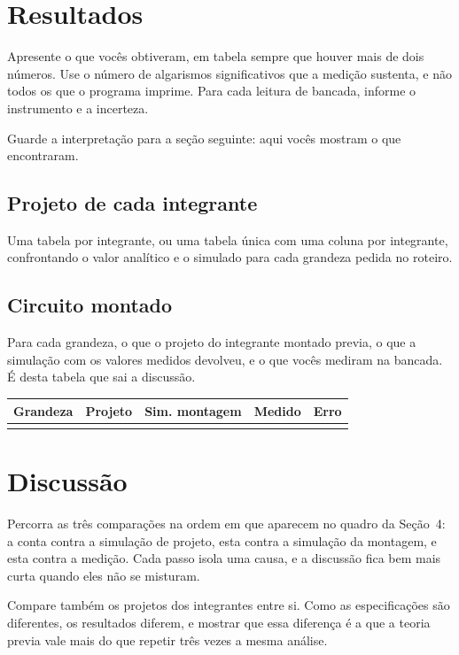 \documentclass[11pt,a4paper]{article}
\begin{document}
\section{Resultados}

Apresente o que vocês obtiveram, em tabela sempre que houver mais de dois números. Use o
número de algarismos significativos que a medição sustenta, e não todos os que o programa
imprime. Para cada leitura de bancada, informe o instrumento e a incerteza.

Guarde a interpretação para a seção seguinte: aqui vocês mostram o que encontraram.

\subsection{Projeto de cada integrante}

Uma tabela por integrante, ou uma tabela única com uma coluna por integrante, confrontando
o valor analítico e o simulado para cada grandeza pedida no roteiro.

\subsection{Circuito montado}

Para cada grandeza, o que o projeto do integrante montado previa, o que a simulação com os
valores medidos devolveu, e o que vocês mediram na bancada. É desta tabela que sai a
discussão.

\begin{center}
\begin{tabular}{@{}lrrrr@{}}
\toprule
\textbf{Grandeza} & \textbf{Projeto} & \textbf{Sim. montagem} & \textbf{Medido} &
\textbf{Erro} \\
\midrule
& & & & \\
\bottomrule
\end{tabular}
\end{center}

\section{Discussão}

Percorra as três comparações na ordem em que aparecem no quadro da Seção~4: a conta contra
a simulação de projeto, esta contra a simulação da montagem, e esta contra a medição. Cada
passo isola uma causa, e a discussão fica bem mais curta quando eles não se misturam.

Compare também os projetos dos integrantes entre si. Como as especificações são diferentes,
os resultados diferem, e mostrar que essa diferença é a que a teoria previa vale mais do
que repetir três vezes a mesma análise.
\end{document}
